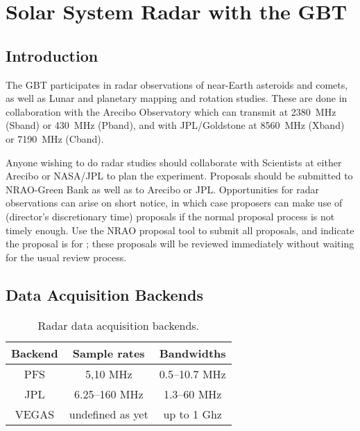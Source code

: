\chapter{Solar System Radar with the GBT}\label{chap:radar}

\vspace{-1cm}

\section{Introduction}
The \gls{GBT} participates in radar observations of near-Earth asteroids and
comets, as well as Lunar and planetary mapping and rotation studies.  These
are done in collaboration with the Arecibo Observatory which can transmit at
2380~MHz (\gls{Sband}) or 430~MHz (\gls{Pband}), and with JPL/Goldstone at
8560~MHz (\gls{Xband}) or 7190~MHz (\gls{Cband}).

Anyone wishing to do radar studies should collaborate with Scientists at either
Arecibo or NASA/JPL to plan the experiment.  Proposals should be submitted to
NRAO-Green Bank as well as to Arecibo or JPL.  Opportunities for radar
observations can arise on short notice, in which case proposers can make use of
 (director's discretionary time) proposals if the normal proposal
process is not timely enough.  Use the \gls{NRAO} proposal tool to submit all
proposals, and indicate the proposal is for ; these proposals will be
reviewed immediately without waiting for the usual review process. 

\vspace{-0.5cm}
\section{Data Acquisition Backends}

\begin{table}[!b]
\begin{center}
\caption[Radar data acquisition backends]
{Radar data acquisition backends.
\label{table:radarbackends}}
\begin{tabular}{ccc}
\toprule
Backend & Sample rates & Bandwidths \\
\midrule
PFS & 5,10 MHz & 0.5--10.7 MHz \\
JPL & 6.25--160 MHz & 1.3--60 MHz \\
VEGAS & undefined as yet  & up to 1 Ghz \\
\bottomrule
\end{tabular}
\end{center}
\end{table}

